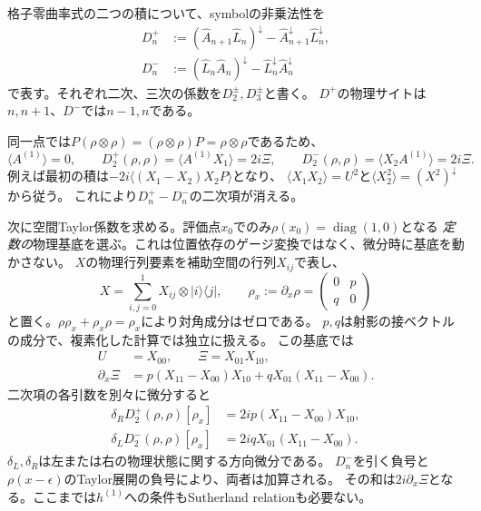 格子零曲率式の二つの積について、symbolの非乗法性を
\begin{align}
D_n^+&:=(\widehat A_{n+1}\widehat L_n)^\downarrow
       -\widehat A_{n+1}^\downarrow\widehat L_n^\downarrow,\nonumber\\
D_n^-&:=(\widehat L_n\widehat A_n)^\downarrow
       -\widehat L_n^\downarrow\widehat A_n^\downarrow
\label{eq:ss-D}
\end{align}
で表す。それぞれ二次、三次の係数を$D_2^\pm,D_3^\pm$と書く。
$D^+$の物理サイトは$n,n+1$、$D^-$では$n-1,n$である。

同一点では$P(\rho\otimes\rho)=(\rho\otimes\rho)P=\rho\otimes\rho$であるため、
\begin{equation}
\langle A^{(1)}\rangle=0,\qquad
D_2^+(\rho,\rho)=\langle A^{(1)}X_1\rangle=2i\Xi,
\qquad D_2^-(\rho,\rho)=\langle X_2A^{(1)}\rangle=2i\Xi.
\label{eq:ss-D2}
\end{equation}
例えば最初の積は$-2i\langle(X_1-X_2)X_2P\rangle$となり、
$\langle X_1X_2\rangle=U^2$と$\langle X_2^2\rangle=(X^2)^\downarrow$から従う。
これにより$D_n^+-D_n^-$の二次項が消える。

次に空間Taylor係数を求める。評価点$x_0$でのみ$\rho(x_0)=\operatorname{diag}(1,0)$となる
\emph{定数の}物理基底を選ぶ。これは位置依存のゲージ変換ではなく、微分時に基底を動かさない。
$X$の物理行列要素を補助空間の行列$X_{ij}$で表し、
\begin{equation}
X=\sum_{i,j=0}^1X_{ij}\otimes|i\rangle\langle j|,
\qquad
\rho_x:=\partial_x\rho=\begin{pmatrix}0&p\\q&0\end{pmatrix}
\label{eq:ss-blocks}
\end{equation}
と置く。$\rho\rho_x+\rho_x\rho=\rho_x$により対角成分はゼロである。
$p,q$は射影の接ベクトルの成分で、複素化した計算では独立に扱える。
この基底では
\begin{align}
U&=X_{00},\qquad \Xi=X_{01}X_{10},\nonumber\\
\partial_x\Xi&=p(X_{11}-X_{00})X_{10}
             +qX_{01}(X_{11}-X_{00}).
\label{eq:ss-Xi-tangent}
\end{align}
二次項の各引数を別々に微分すると
\begin{align}
\delta_R D_2^+(\rho,\rho)[\rho_x]&=2ip(X_{11}-X_{00})X_{10},\nonumber\\
\delta_L D_2^-(\rho,\rho)[\rho_x]&=2iqX_{01}(X_{11}-X_{00}).
\label{eq:ss-D2-tangent}
\end{align}
$\delta_L,\delta_R$は左または右の物理状態に関する方向微分である。
$D_n^-$を引く負号と$\rho(x-\epsilon)$のTaylor展開の負号により、両者は加算される。
その和は$2i\partial_x\Xi$となる。ここまでは$h^{(1)}$への条件もSutherland relationも必要ない。

